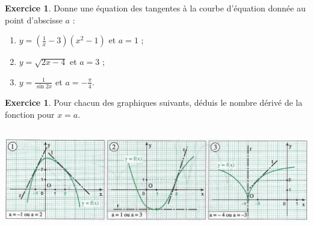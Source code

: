 \documentclass[a4paper,fontsize=13pt]{scrreprt}
\theoremstyle{plain}
\theoremstyle{definition}
\newtheorem{exo}[subsection]{Exercice}
\newtheorem*{solu}{Solution}
\newenvironment{benumerate}[1][0pt]{\begin{enumerate}\renewcommand{\makelabel}[1]{\textbf{##1}}\setlength{\itemsep}{#1}}{\end{enumerate}}
\renewcommand{\d}{\displaystyle}
\begin{document}
\begin{exo} Donne une équation des tangentes à la courbe d'équation donnée au point d'abscisse $a$ :
\begin{benumerate}[5pt]
\item $\d y = \left( \frac{1}{x}-3\right)(x^2-1)$ \quad et \quad $a=1$ ;
\item $\d y = \sqrt{2x-4}$ \quad et \quad $a=3$ ;
\item $\d y = \frac{1}{\sin 2x}$ \quad et \quad $\d a = -\frac{\pi}{4}$.
\end{benumerate}
\end{exo}

\begin{exo} Pour chacun des graphiques suivants, déduis le nombre dérivé de la fonction pour $x=a$.

\begin{center}
\includegraphics[height=4.5cm]{ex_10.jpg}
\end{center}
\end{exo}

\end{document}
